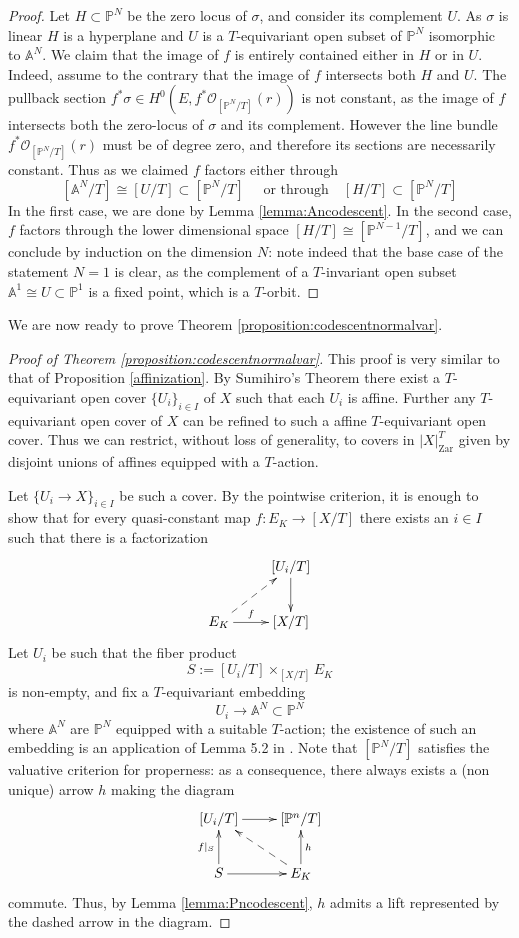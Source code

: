 \documentclass[11pt,letterpaper]{amsart}
\newcommand{\bA}{\mathbb{A}}
\newcommand{\bP}{\mathbb{P}}
\newcommand{\cO}{\mathcal{O}}
\newcommand{\Zar}[1]{|#1|_{\mathrm{Zar}}}
\begin{document}
\begin{proof}
Let $H \subset \bP^N$ be the zero locus of $\sigma$, and consider its complement $U$. As $\sigma$ is linear $H$ is a hyperplane and $U$ is a $T$-equivariant open subset of $\bP^N$ isomorphic to $\mathbb{A}^N$. We claim that the image of $f$ is entirely contained either in $H$ or in $U$. Indeed, assume to the contrary that the image of  $f$ intersects both $H$ and $U$. The pullback section $f^\ast\sigma \in H^0(E, f^\ast\cO_{[\bP^N/T]}(r))$ is not constant, as the image of $f$ intersects both the zero-locus of $\sigma$ and its complement. However the line bundle $f^\ast\cO_{[\bP^N/T]}(r)$ must be of degree zero, and therefore its sections are necessarily constant. Thus as we claimed $f$ factors either through 
$$[\bA^N/T] \cong [U/T] \subset [\bP^N/T] \quad \text{ or through} \quad [H/T] \subset [\bP^N/T]$$ 
In the first case, we are done by Lemma \ref{lemma:Ancodescent}. In the second case, $f$ factors through the lower dimensional  space $[H/T] \cong [\bP^{N-1}/T]$, and we can conclude by induction on the dimension $N$: note indeed  that the base case of the statement $N=1$ is clear, as the complement of a $T$-invariant open subset $\bA^1 \cong U \subset \bP^1$ is a fixed point, which is a $T$-orbit. 
\end{proof}

We are now ready to prove Theorem \ref{proposition:codescentnormalvar}.
\begin{proof}[Proof of Theorem \ref{proposition:codescentnormalvar}]
This proof is very similar to that of Proposition \ref{affinization}. By Sumihiro's Theorem \cite{sumihiro1974equivariant} there exist a $T$-equivariant open cover 
$\{U_i\}_{i \in I}$ of $X$ such that each $U_i$ is affine. Further any $T$-equivariant open cover of $X$ can be refined to such a affine $T$-equivariant open cover. Thus  we can restrict, without loss of generality, to covers in $\Zar{X}^T$ given by disjoint unions of affines equipped with a $T$-action.


Let $\{U_i \to X\}_{i \in I}$ be such a cover. By the pointwise criterion, it is enough to show that for every quasi-constant  map $f:E_K \to [X/T]$ there exists an $i \in I$ such that there is a factorization
$$
\xymatrix{
& [U_i/T] \ar[d] \\
E_K \ar@{-->}[ur] \ar[r]^-f & [X/T]}
$$
Let $U_i$ be such that the fiber product 
$$
S:=[U_i/T] \times_{[X/T]} E_K    
$$
is non-empty, and fix a $T$-equivariant embedding
$$
U_i \to \bA^N \subset \bP^N
$$
where $\bA^N$ are $\bP^N$ equipped with a suitable $T$-action; the existence of such an embedding is an application of Lemma 5.2 in \cite{Luna}. Note that $[\bP^N/T]$ satisfies the valuative criterion for properness: as a consequence, there always exists a (non unique) arrow $h$ making the diagram 
$$
\xymatrix{
[U_i/T] \ar[r] & [\mathbb{P}^n/T] \\
S \ar[r] \ar[u]^-{f|_S} & E_K \ar[u]_-h \ar@{-->}[lu]
}
$$
commute. Thus, by Lemma \ref{lemma:Pncodescent}, $h$ admits a lift represented by the dashed arrow in the diagram. 
\end{proof}
\end{document}
